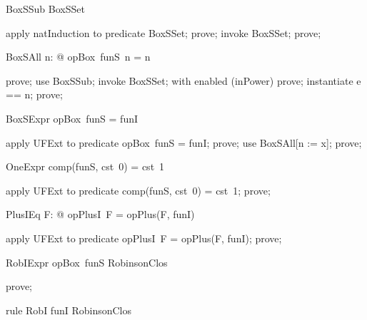 \documentclass{article}
\begin{document}
\begin{theorem}{BoxSSub}
  \nat \subseteq BoxSSet
\end{theorem}

\begin{zproof}
apply natInduction to predicate \nat \subseteq BoxSSet;
prove;
invoke BoxSSet;
prove;
\end{zproof}

\begin{theorem}{BoxSAll}
  \forall n: \nat @ opBox~funS~n = n
\end{theorem}

\begin{zproof}
prove;
use BoxSSub;
invoke BoxSSet;
with enabled (inPower) prove;
instantiate e == n;
prove;
\end{zproof}

\begin{theorem}{BoxSExpr}
  opBox~funS = funI
\end{theorem}

\begin{zproof}
apply UFExt to predicate opBox~funS = funI;
prove;
use BoxSAll[n := x];
prove;
\end{zproof}

\begin{theorem}{OneExpr}
  comp(funS, cst~0) = cst~1
\end{theorem}

\begin{zproof}
apply UFExt to predicate comp(funS, cst~0) = cst~1;
prove;
\end{zproof}

\begin{theorem}{PlusIEq}
  \forall F: \nat \fun \nat @ opPlusI~F = opPlus(F, funI)
\end{theorem}

\begin{zproof}
apply UFExt to predicate opPlusI~F = opPlus(F, funI);
prove;
\end{zproof}

\begin{theorem}{RobIExpr}
  opBox~funS \in RobinsonClos
\end{theorem}

\begin{zproof}
prove;
\end{zproof}

\begin{theorem}{rule RobI}
  funI \in RobinsonClos
\end{theorem}
\end{document}
